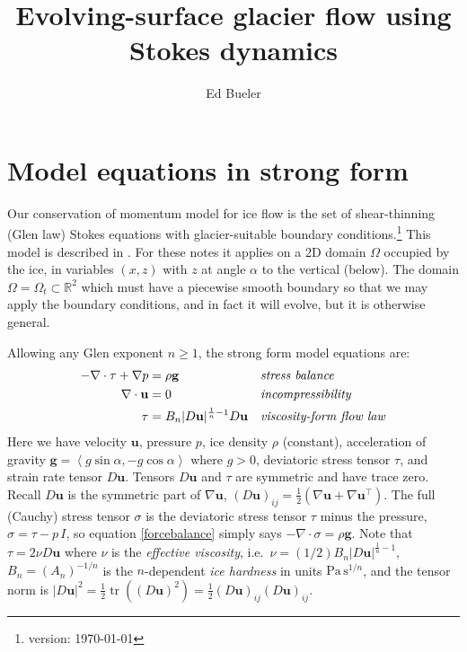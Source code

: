 \documentclass[letterpaper,final,12pt,reqno]{amsart}
\newcommand{\RR}{\mathbb{R}}
\newcommand{\grad}{\nabla}
\newcommand{\Div}{\nabla\cdot}
\newcommand{\trace}{\operatorname{tr}}
\newcommand{\bg}{\mathbf{g}}
\newcommand{\bu}{\mathbf{u}}
\begin{document}
\graphicspath{{figures/}}

\title{Evolving-surface glacier flow using Stokes dynamics}

\author{Ed Bueler}

\maketitle

\thispagestyle{empty}
\bigskip

\section{Model equations in strong form} \label{sec:strongform}

Our conservation of momentum model for ice flow is the set of shear-thinning (Glen law) Stokes equations with glacier-suitable boundary conditions.\footnote{version: \today}  This model is described in \cite{GreveBlatter2009,JouvetRappaz2011}.  For these notes it applies on a 2D domain $\Omega$ occupied by the ice, in variables $(x,z)$ with $z$ at angle $\alpha$ to the vertical (below).  The domain $\Omega = \Omega_t \subset \RR^2$ which must have a piecewise smooth boundary so that we may apply the boundary conditions, and in fact it will evolve, but it is otherwise general.

Allowing any Glen exponent $n\ge 1$, the strong form model equations are:
\begin{align}
- \nabla \cdot \tau + \nabla p &= \rho \bg &&\text{\emph{stress balance}} \label{forcebalance} \\
\nabla \cdot \bu &= 0 &&\text{\emph{incompressibility}} \label{incompressible} \\
\tau &= B_n |D\bu|^{\frac{1}{n} - 1} D\bu  &&\text{\emph{viscosity-form flow law}} \label{viscflowlaw}
\end{align}
Here we have velocity $\bu$, pressure $p$, ice density $\rho$ (constant), acceleration of gravity $\bg = \left<g\sin\alpha,-g\cos\alpha\right>$ where $g>0$, deviatoric stress tensor $\tau$, and strain rate tensor $D\bu$.  Tensors $D\bu$ and $\tau$ are symmetric and have trace zero.  Recall $D\bu$ is the symmetric part of $\grad \bu$, $(D\bu)_{ij} = \frac{1}{2} \left(\grad\bu + \grad\bu^\top\right)$.  The full (Cauchy) stress tensor $\sigma$ is the deviatoric stress tensor $\tau$ minus the pressure, $\sigma = \tau - p\,I$, so equation \eqref{forcebalance} simply says $-\Div \sigma = \rho \bg$.  Note that $\tau = 2\nu D\bu$ where $\nu$ is the \emph{effective viscosity}, i.e.~$\nu=(1/2)B_n |D\bu|^{\frac{1}{n} - 1}$, $B_n = (A_n)^{-1/n}$ is the $n$-dependent \emph{ice hardness} in units $\text{Pa}\,\text{s}^{1/n}$, and the tensor norm is $|D\bu|^2 = \frac{1}{2} \trace\left((D\bu)^2\right) = \frac{1}{2} (D\bu)_{ij} (D\bu)_{ij}$.
\end{document}
